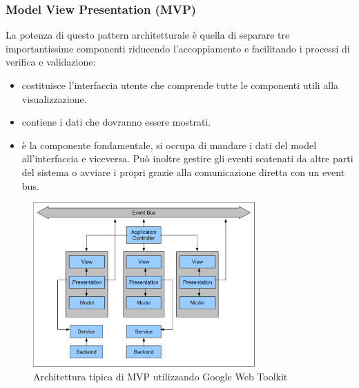 \newpage
\subsubsection{Model View Presentation (MVP) }
La potenza di questo pattern architetturale \`e quella di separare tre
importantissime componenti riducendo l'accoppiamento e facilitando i processi di
verifica e validazione:
\begin{itemize}
  \item{ }
  costituisce l'interfaccia utente che comprende tutte le componenti utili alla
  visualizzazione.
  \item{ }
  contiene i dati che dovranno essere mostrati. 
  \item{ }
  \`e la componente fondamentale, si occupa di mandare i dati del model
  all'interfaccia e viceversa. Pu\`o inoltre gestire gli eventi scatenati da
  altre parti del sistema o avviare i propri grazie alla comunicazione diretta
  con un event bus.

\end{itemize}    
\begin{figure}[!h]
\centering
\includegraphics[width=8.5cm]{img/ST/mvp.png}
\caption{Architettura tipica di MVP utilizzando Google Web Toolkit}
\end{figure}

